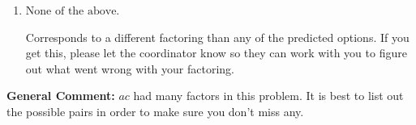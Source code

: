 \documentclass{extbook}[14pt]
\begin{document}
\begin{enumerate}
{\begin{enumerate}[label=\Alph*.]
* $(6x -5)(6x -5)$, which is the correct option.
\item \( \text{None of the above.} \)

 Corresponds to a different factoring than any of the predicted options. If you get this, please let the coordinator know so they can work with you to figure out what went wrong with your factoring.
\end{enumerate}

\textbf{General Comment:} $ac$ had many factors in this problem. It is best to list out the possible pairs in order to make sure you don't miss any.
}
\end{enumerate}
\end{document}
